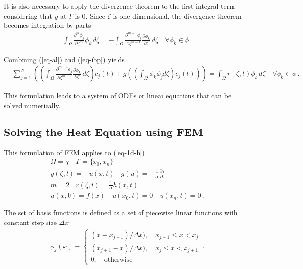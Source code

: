 It is also necessary to apply the divergence theorem to the first integral term considering that \(y\) at \(\Gamma\) is 0.
Since \(\zeta\) is one dimensional, the divergence theorem becomes integration by parts
\begin{gather}
\int_{\Omega} \frac{\partial^{m} \phi_{j}}{\partial \zeta^{m}} \phi_{k} \, d\zeta = - \int_{\Omega} \frac{\partial^{m-1} \phi_{j}}{\partial \zeta^{m-1}} \frac{\partial \phi_{k}}{\partial \zeta} \, d\zeta \quad \forall \phi_{k} \in \phi \,. \label{eq-ibp}
\end{gather}

Combining (\ref{eq-al}) and (\ref{eq-ibp}) yields
\begin{gather}
-\sum_{j = 1}^{N} \left(\left(\int_{\Omega} \frac{\partial^{m-1} \phi_{j}}{\partial \zeta^{m-1}} \frac{\partial \phi_{k}}{\partial \zeta} \, d\zeta\right) c_{j}(t) + g\left(\left(\int_{\Omega} \phi_k \phi_j d\zeta\right) c_{j}(t)\right)\right)  = \int_{\Omega}  r(\zeta, t) \phi_{k}        \, d\zeta \quad \forall \phi_{k} \in \phi \,. \label{eq-fem}
\end{gather}

This formulation leads to a system of ODEs or linear equations that can be solved numerically.
\subsection{Solving the Heat Equation using FEM}
This formulation of FEM applies to (\ref{eq-1d-h})
\begin{gather}
\Omega = \chi \quad \Gamma = \{x_{0}, x_{n}\} \\
y(\zeta, t) = -u(x, t) \quad g(u) = -\frac{1}{\alpha} \frac{\partial u}{\partial t} \\
m = 2 \quad r(\zeta, t) = \frac{1}{\alpha} h(x,t) \\
u(x, 0) = f(x) \quad u(x_{0}, t) = 0 \quad u(x_{n}, t) = 0 \,.
\end{gather}

The set of basis functions is defined as a set of piecewise linear functions with constant step size \(\Delta x\)
\begin{gather}
    \phi_j(x)= 
\begin{cases}
    (x - x_{j-1}) / \Delta x), \quad x_{j-1} \leq x <  x_{j}\\
    (x_{j+1} - x) / \Delta x), \quad x_{j} \leq x <  x_{j + 1}\\
    0,              \quad \text{otherwise}
\end{cases} \,.
\end{gather}
\cite{Gustafsson2011d}

